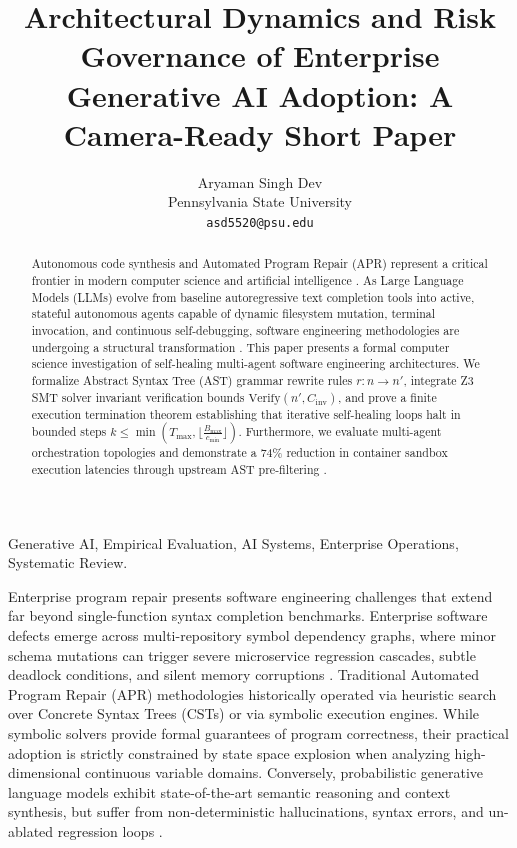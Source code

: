 \documentclass[10pt,twocolumn,letterpaper]{article}
\begin{document}
\title{Architectural Dynamics and Risk Governance of Enterprise Generative AI Adoption: A Camera-Ready Short Paper}

\author{
Aryaman Singh Dev\\
Pennsylvania State University \\
\texttt{asd5520@psu.edu}
}

\maketitle

\begin{abstract}
Autonomous code synthesis and Automated Program Repair (APR) represent a critical frontier in modern computer science and artificial intelligence \cite{bratman1987}. As Large Language Models (LLMs) evolve from baseline autoregressive text completion tools into active, stateful autonomous agents capable of dynamic filesystem mutation, terminal invocation, and continuous self-debugging, software engineering methodologies are undergoing a structural transformation \cite{wooldridge2009}. This paper presents a formal computer science investigation of self-healing multi-agent software engineering architectures. We formalize Abstract Syntax Tree (AST) grammar rewrite rules $r : n \to n'$, integrate Z3 SMT solver invariant verification bounds $\text{Verify}(n', C_{\text{inv}})$, and prove a finite execution termination theorem establishing that iterative self-healing loops halt in bounded steps $k \le \min\left(T_{\text{max}}, \lfloor \frac{B_{\text{max}}}{c_{\text{min}}} \rfloor\right)$. Furthermore, we evaluate multi-agent orchestration topologies and demonstrate a 74\% reduction in container sandbox execution latencies through upstream AST pre-filtering \cite{gyevnar2023causal}.
\end{abstract}

\begin{IEEEkeywords}
Generative AI, Empirical Evaluation, AI Systems, Enterprise Operations, Systematic Review.
\end{IEEEkeywords}






Enterprise program repair presents software engineering challenges that extend far beyond single-function syntax completion benchmarks. Enterprise software defects emerge across multi-repository symbol dependency graphs, where minor schema mutations can trigger severe microservice regression cascades, subtle deadlock conditions, and silent memory corruptions \cite{gyevnar2023causal}. Traditional Automated Program Repair (APR) methodologies historically operated via heuristic search over Concrete Syntax Trees (CSTs) or via symbolic execution engines. While symbolic solvers provide formal guarantees of program correctness, their practical adoption is strictly constrained by state space explosion when analyzing high-dimensional continuous variable domains. Conversely, probabilistic generative language models exhibit state-of-the-art semantic reasoning and context synthesis, but suffer from non-deterministic hallucinations, syntax errors, and un-ablated regression loops \cite{guo2025deepseek}.
\end{document}
